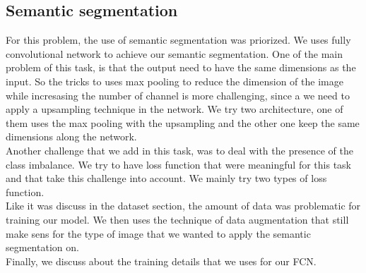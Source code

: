 \subsection{Semantic segmentation}
For this problem, the use of semantic segmentation was priorized. We uses fully convolutional network to achieve our semantic segmentation. One of the main problem of this task, is that the output need to have the same dimensions as the input. So the tricks to uses max pooling to reduce the dimension of the image while incresasing the number of channel is more challenging, since a we need to apply a upsampling technique in the network. We try two architecture, one of them uses the max pooling with the upsampling and the other one keep the same dimensions along the network. 
\\
Another challenge that we add in this task, was to deal with the presence of the class imbalance. We try to have loss function that were meaningful for this task and that take this challenge into account. We mainly try two types of loss function.
\\
Like it was discuss in the dataset section, the amount of data was problematic for training our model. We then uses the technique of data augmentation that still make sens for the type of image that we wanted to apply the semantic segmentation on.
\\
Finally, we discuss about the training details that we uses for our FCN.

